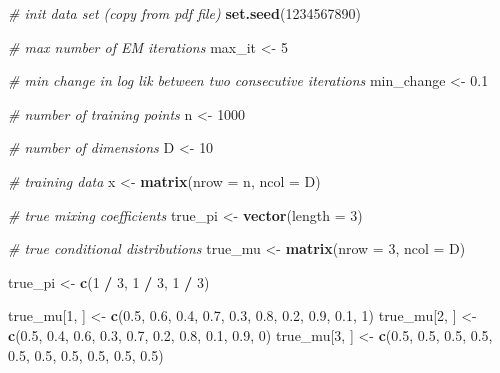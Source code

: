 \documentclass[
]{article}
\newenvironment{Shaded}{\begin{snugshade}}{\end{snugshade}}
\newcommand{\AttributeTok}[1]{\textcolor[rgb]{0.13,0.29,0.53}{#1}}
\newcommand{\CommentTok}[1]{\textcolor[rgb]{0.56,0.35,0.01}{\textit{#1}}}
\newcommand{\DecValTok}[1]{\textcolor[rgb]{0.00,0.00,0.81}{#1}}
\newcommand{\FloatTok}[1]{\textcolor[rgb]{0.00,0.00,0.81}{#1}}
\newcommand{\FunctionTok}[1]{\textcolor[rgb]{0.13,0.29,0.53}{\textbf{#1}}}
\newcommand{\NormalTok}[1]{#1}
\newcommand{\OtherTok}[1]{\textcolor[rgb]{0.56,0.35,0.01}{#1}}
\newcommand{\SpecialCharTok}[1]{\textcolor[rgb]{0.81,0.36,0.00}{\textbf{#1}}}
\begin{document}
\begin{Shaded}
\begin{Highlighting}[]
    \CommentTok{\# init data set (copy from pdf file)}
    \FunctionTok{set.seed}\NormalTok{(}\DecValTok{1234567890}\NormalTok{)}

    \CommentTok{\# max number of EM iterations}
\NormalTok{    max\_it }\OtherTok{\textless{}{-}} \DecValTok{5}

    \CommentTok{\# min change in log lik between two consecutive iterations}
\NormalTok{    min\_change }\OtherTok{\textless{}{-}} \FloatTok{0.1}

    \CommentTok{\# number of training points}
\NormalTok{    n }\OtherTok{\textless{}{-}} \DecValTok{1000}

    \CommentTok{\# number of dimensions}
\NormalTok{    D }\OtherTok{\textless{}{-}} \DecValTok{10}

    \CommentTok{\# training data}
\NormalTok{    x }\OtherTok{\textless{}{-}} \FunctionTok{matrix}\NormalTok{(}\AttributeTok{nrow =}\NormalTok{ n, }\AttributeTok{ncol =}\NormalTok{ D)}

    \CommentTok{\# true mixing coefficients}
\NormalTok{    true\_pi }\OtherTok{\textless{}{-}} \FunctionTok{vector}\NormalTok{(}\AttributeTok{length =} \DecValTok{3}\NormalTok{)}

    \CommentTok{\# true conditional distributions}
\NormalTok{    true\_mu }\OtherTok{\textless{}{-}} \FunctionTok{matrix}\NormalTok{(}\AttributeTok{nrow =} \DecValTok{3}\NormalTok{, }\AttributeTok{ncol =}\NormalTok{ D)}

\NormalTok{    true\_pi }\OtherTok{\textless{}{-}} \FunctionTok{c}\NormalTok{(}\DecValTok{1} \SpecialCharTok{/} \DecValTok{3}\NormalTok{, }\DecValTok{1} \SpecialCharTok{/} \DecValTok{3}\NormalTok{, }\DecValTok{1} \SpecialCharTok{/} \DecValTok{3}\NormalTok{)}

\NormalTok{    true\_mu[}\DecValTok{1}\NormalTok{, ] }\OtherTok{\textless{}{-}} \FunctionTok{c}\NormalTok{(}\FloatTok{0.5}\NormalTok{, }\FloatTok{0.6}\NormalTok{, }\FloatTok{0.4}\NormalTok{, }\FloatTok{0.7}\NormalTok{, }\FloatTok{0.3}\NormalTok{, }\FloatTok{0.8}\NormalTok{, }\FloatTok{0.2}\NormalTok{, }\FloatTok{0.9}\NormalTok{, }\FloatTok{0.1}\NormalTok{, }\DecValTok{1}\NormalTok{)}
\NormalTok{    true\_mu[}\DecValTok{2}\NormalTok{, ] }\OtherTok{\textless{}{-}} \FunctionTok{c}\NormalTok{(}\FloatTok{0.5}\NormalTok{, }\FloatTok{0.4}\NormalTok{, }\FloatTok{0.6}\NormalTok{, }\FloatTok{0.3}\NormalTok{, }\FloatTok{0.7}\NormalTok{, }\FloatTok{0.2}\NormalTok{, }\FloatTok{0.8}\NormalTok{, }\FloatTok{0.1}\NormalTok{, }\FloatTok{0.9}\NormalTok{, }\DecValTok{0}\NormalTok{)}
\NormalTok{    true\_mu[}\DecValTok{3}\NormalTok{, ] }\OtherTok{\textless{}{-}} \FunctionTok{c}\NormalTok{(}\FloatTok{0.5}\NormalTok{, }\FloatTok{0.5}\NormalTok{, }\FloatTok{0.5}\NormalTok{, }\FloatTok{0.5}\NormalTok{, }\FloatTok{0.5}\NormalTok{, }\FloatTok{0.5}\NormalTok{, }\FloatTok{0.5}\NormalTok{, }\FloatTok{0.5}\NormalTok{, }\FloatTok{0.5}\NormalTok{, }\FloatTok{0.5}\NormalTok{)}


\end{Highlighting}
\end{Shaded}
\end{document}
